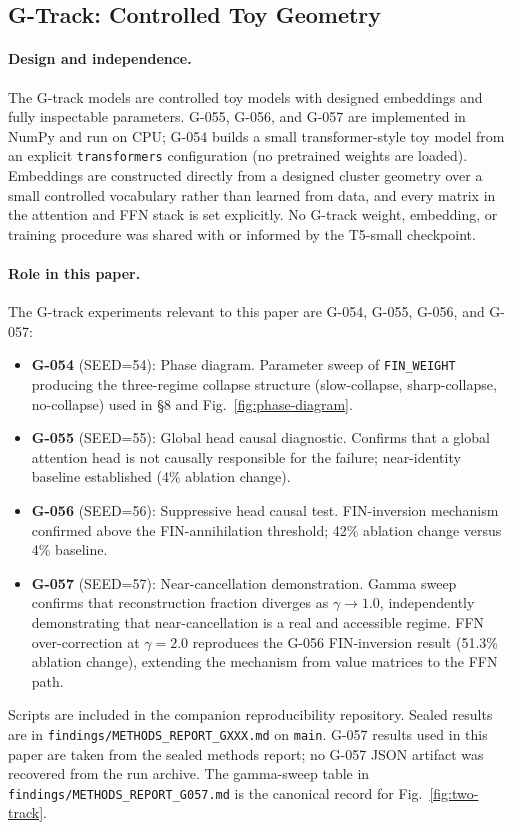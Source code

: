 \subsection{G-Track: Controlled Toy Geometry}

\paragraph{Design and independence.}
The G-track models are controlled toy models with designed embeddings and fully
inspectable parameters. G-055, G-056, and G-057 are implemented in NumPy and run on CPU;
G-054 builds a small transformer-style toy model from an explicit \texttt{transformers}
configuration (no pretrained weights are loaded). Embeddings are constructed directly from
a designed cluster geometry over a small controlled vocabulary rather than learned from
data, and every matrix in the attention and FFN stack is set explicitly.
No G-track weight, embedding, or training procedure was shared with or informed by
the T5-small checkpoint.

\paragraph{Role in this paper.}
The G-track experiments relevant to this paper are G-054, G-055, G-056, and G-057:
\begin{itemize}
  \item \textbf{G-054} (SEED=54): Phase diagram. Parameter sweep of \texttt{FIN\_WEIGHT}
    producing the three-regime collapse structure (slow-collapse, sharp-collapse,
    no-collapse) used in \S8 and Fig.~\ref{fig:phase-diagram}.
  \item \textbf{G-055} (SEED=55): Global head causal diagnostic. Confirms that a
    global attention head is not causally responsible for the failure; near-identity
    baseline established (4\% ablation change).
  \item \textbf{G-056} (SEED=56): Suppressive head causal test. FIN-inversion
    mechanism confirmed above the FIN-annihilation threshold; 42\% ablation change
    versus 4\% baseline.
  \item \textbf{G-057} (SEED=57): Near-cancellation demonstration. Gamma sweep
    confirms that reconstruction fraction diverges as $\gamma \to 1.0$, independently
    demonstrating that near-cancellation is a real and accessible regime.
    FFN over-correction at $\gamma=2.0$ reproduces the G-056 FIN-inversion result
    (51.3\% ablation change), extending the mechanism from value matrices to the FFN path.
\end{itemize}
Scripts are included in the companion reproducibility repository.
Sealed results are in \texttt{findings/METHODS\_REPORT\_GXXX.md} on \texttt{main}.
G-057 results used in this paper are taken from the sealed methods report;
no G-057 JSON artifact was recovered from the run archive. The gamma-sweep table in
\texttt{findings/METHODS\_REPORT\_G057.md} is the canonical record for Fig.~\ref{fig:two-track}.

